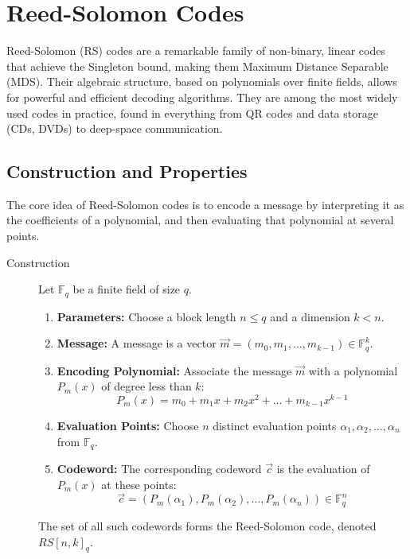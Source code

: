 
\section{Reed-Solomon Codes}

Reed-Solomon (RS) codes are a remarkable family of non-binary, linear codes that achieve the Singleton bound, making them Maximum Distance Separable (MDS). Their algebraic structure, based on polynomials over finite fields, allows for powerful and efficient decoding algorithms. They are among the most widely used codes in practice, found in everything from QR codes and data storage (CDs, DVDs) to deep-space communication.

\subsection{Construction and Properties}

The core idea of Reed-Solomon codes is to encode a message by interpreting it as the coefficients of a polynomial, and then evaluating that polynomial at several points.

\begin{description}
    \item[Construction] Let $\mathbb{F}_q$ be a finite field of size $q$.
    \begin{enumerate}
        \item \textbf{Parameters:} Choose a block length $n \le q$ and a dimension $k < n$.
        \item \textbf{Message:} A message is a vector $\vec{m} = (m_0, m_1, \dots, m_{k-1}) \in \mathbb{F}_q^k$.
        \item \textbf{Encoding Polynomial:} Associate the message $\vec{m}$ with a polynomial $P_m(x)$ of degree less than $k$:
        \[ P_m(x) = m_0 + m_1 x + m_2 x^2 + \dots + m_{k-1} x^{k-1} \]
        \item \textbf{Evaluation Points:} Choose $n$ distinct evaluation points $\alpha_1, \alpha_2, \dots, \alpha_n$ from $\mathbb{F}_q$.
        \item \textbf{Codeword:} The corresponding codeword $\vec{c}$ is the evaluation of $P_m(x)$ at these points:
        \[ \vec{c} = (P_m(\alpha_1), P_m(\alpha_2), \dots, P_m(\alpha_n)) \in \mathbb{F}_q^n \]
    \end{enumerate}
    The set of all such codewords forms the Reed-Solomon code, denoted $RS[n, k]_q$.
\end{description}

